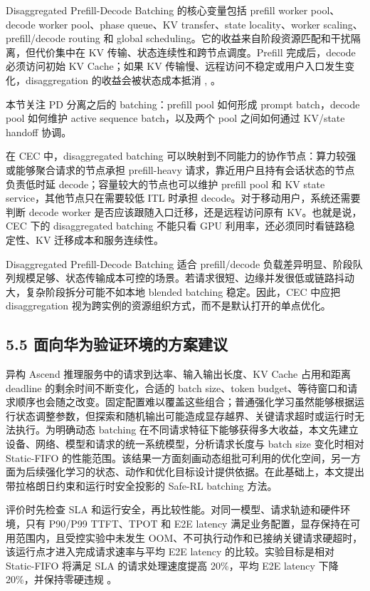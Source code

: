 Disaggregated Prefill-Decode Batching 的核心变量包括 prefill worker pool、decode worker pool、phase queue、KV transfer、state locality、worker scaling、prefill/decode routing 和 global scheduling。它的收益来自阶段资源匹配和干扰隔离，但代价集中在 KV 传输、状态连续性和跨节点调度。Prefill 完成后，decode 必须访问初始 KV Cache；如果 KV 传输慢、远程访问不稳定或用户入口发生变化，disaggregation 的收益会被状态成本抵消 \cite{zhong2024distserve}, \cite{qin2025mooncake}。

本节关注 PD 分离之后的 batching：prefill pool 如何形成 prompt batch，decode pool 如何维护 active sequence batch，以及两个 pool 之间如何通过 KV/state handoff 协调。

在 CEC 中，disaggregated batching 可以映射到不同能力的协作节点：算力较强或能够聚合请求的节点承担 prefill-heavy 请求，靠近用户且持有会话状态的节点负责低时延 decode；容量较大的节点也可以维护 prefill pool 和 KV state service，其他节点只在需要较低 ITL 时承担 decode。对于移动用户，系统还需要判断 decode worker 是否应该跟随入口迁移，还是远程访问原有 KV。也就是说，CEC 下的 disaggregated batching 不能只看 GPU 利用率，还必须同时看链路稳定性、KV 迁移成本和服务连续性。

Disaggregated Prefill-Decode Batching 适合 prefill/decode 负载差异明显、阶段队列规模足够、状态传输成本可控的场景。若请求很短、边缘并发很低或链路抖动大，复杂阶段拆分可能不如本地 blended batching 稳定。因此，CEC 中应把 disaggregation 视为跨实例的资源组织方式，而不是默认打开的单点优化。
\subsection*{5.5 面向华为验证环境的方案建议}

异构 Ascend 推理服务中的请求到达率、输入输出长度、KV Cache 占用和距离 deadline 的剩余时间不断变化，合适的 batch size、token budget、等待窗口和请求顺序也会随之改变。固定配置难以覆盖这些组合；普通强化学习虽然能够根据运行状态调整参数，但探索和随机输出可能造成显存越界、关键请求超时或运行时无法执行。为明确动态 batching 在不同请求特征下能够获得多大收益，本文先建立设备、网络、模型和请求的统一系统模型，分析请求长度与 batch size 变化时相对 Static-FIFO 的性能范围。该结果一方面刻画动态组批可利用的优化空间，另一方面为后续强化学习的状态、动作和优化目标设计提供依据。在此基础上，本文提出带拉格朗日约束和运行时安全投影的 Safe-RL batching 方法。

评价时先检查 SLA 和运行安全，再比较性能。对同一模型、请求轨迹和硬件环境，只有 P90/P99 TTFT、TPOT 和 E2E latency 满足业务配置，显存保持在可用范围内，且受控实验中未发生 OOM、不可执行动作和已接纳关键请求硬超时，该运行点才进入完成请求速率与平均 E2E latency 的比较。实验目标是相对 Static-FIFO 将满足 SLA 的请求处理速度提高 20\%，平均 E2E latency 下降 20\%，并保持零硬违规 \cite{huawei2026internal}。

